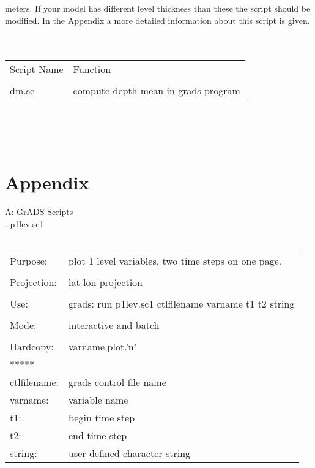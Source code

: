 meters. If your model has different level thickness than these the script should be modified.
In the Appendix a more detailed information about this script is given.
\\
\\
\\
\begin{tabular}{ll}

Script Name	&	Function  \\
\\
dm.sc           &   compute depth-mean in grads program  
\\
\end{tabular}
\\
\baselineskip=18pt
\\
\\
\newpage
\section{Appendix}
A: GrADS Scripts
\\
. p1lev.sc1  \\  \\
\begin{tabular}{ll}
Purpose:    &     plot 1 level variables, two time steps on one page.       \\
\\
Projection: &	  lat-lon projection                                        \\
\\
Use:        &     grads: run p1lev.sc1 ctlfilename varname t1 t2 string     \\
\\
Mode:       &     interactive and batch                                     \\
\\
Hardcopy:   &     varname.plot.'n'                                          \\                                        
*****  \\
ctlfilename: &   grads control file name            \\
varname:     &   variable name              \\       
t1:       &   begin time step          \\
t2:       &   end time step         \\
string:   &   user defined character string  \\
\end{tabular}
\\

